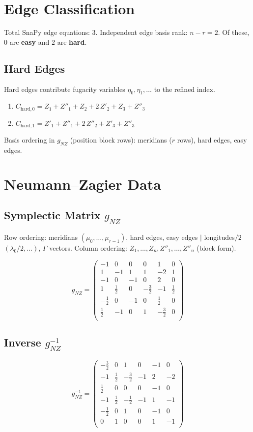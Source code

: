 \documentclass[11pt,a4paper]{article}
\begin{document}
\section{Edge Classification}
Total SnaPy edge equations: $3$.
Independent edge basis rank: $n - r = 2$.
Of these, $0$ are \textbf{easy} and $2$ are \textbf{hard}.

\subsection{Hard Edges}
Hard edges contribute fugacity variables $\eta_0, \eta_1, \ldots$ to the refined index.
\begin{enumerate}
  \item $C_{\text{hard},0} = Z_{1} + Z''_{1} + Z_{2} + 2\,Z'_{2} + Z_{3} + Z''_{3}$
  \item $C_{\text{hard},1} = Z'_{1} + Z''_{1} + 2\,Z''_{2} + Z'_{3} + Z''_{3}$
\end{enumerate}

Basis ordering in $g_{NZ}$ (position block rows): meridians ($r$ rows), hard edges, easy edges.

\section{Neumann--Zagier Data}
\subsection{Symplectic Matrix $g_{NZ}$}
Row ordering: meridians $(\mu_0,\ldots,\mu_{r-1})$, hard edges, easy edges $\mid$ longitudes$/2$ $(\lambda_0/2,\ldots)$, $\Gamma$ vectors.
Column ordering: $Z_1,\ldots,Z_n, Z''_1,\ldots,Z''_n$ (block form).

$$
g_{NZ} = 
\begin{pmatrix}
-1 & 0 & 0 & 0 & 1 & 0 \\
1 & -1 & 1 & 1 & -2 & 1 \\
-1 & 0 & -1 & 0 & 2 & 0 \\
1 & \frac{1}{2} & 0 & -\frac{3}{2} & -1 & \frac{1}{2} \\
-\frac{1}{2} & 0 & -1 & 0 & \frac{1}{2} & 0 \\
\frac{1}{2} & -1 & 0 & 1 & -\frac{3}{2} & 0 \\
\end{pmatrix}
$$

\subsection{Inverse $g_{NZ}^{-1}$}
$$
g_{NZ}^{-1} = 
\begin{pmatrix}
-\frac{3}{2} & 0 & 1 & 0 & -1 & 0 \\
-1 & \frac{1}{2} & -\frac{3}{2} & -1 & 2 & -2 \\
\frac{1}{2} & 0 & 0 & 0 & -1 & 0 \\
-1 & \frac{1}{2} & -\frac{1}{2} & -1 & 1 & -1 \\
-\frac{1}{2} & 0 & 1 & 0 & -1 & 0 \\
0 & 1 & 0 & 0 & 1 & -1 \\
\end{pmatrix}
$$
\end{document}
